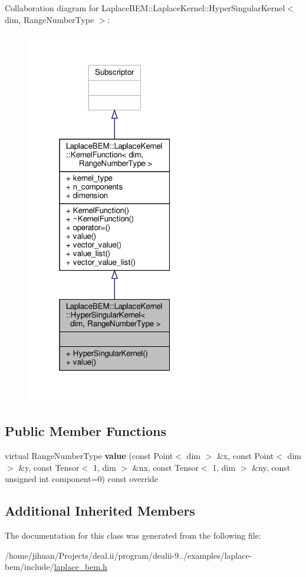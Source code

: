 Collaboration diagram for Laplace\+B\+EM\+:\+:Laplace\+Kernel\+:\+:Hyper\+Singular\+Kernel$<$ dim, Range\+Number\+Type $>$\+:\nopagebreak
\begin{figure}[H]
\begin{center}
\leavevmode
\includegraphics[width=220pt]{classLaplaceBEM_1_1LaplaceKernel_1_1HyperSingularKernel__coll__graph}
\end{center}
\end{figure}
\subsection*{Public Member Functions}
\begin{DoxyCompactItemize}
\item 
\mbox{\label{classLaplaceBEM_1_1LaplaceKernel_1_1HyperSingularKernel_a02811fc623d2bb605c5eeb22712bdfd6}} 
virtual Range\+Number\+Type {\bfseries value} (const Point$<$ dim $>$ \&x, const Point$<$ dim $>$ \&y, const Tensor$<$ 1, dim $>$ \&nx, const Tensor$<$ 1, dim $>$ \&ny, const unsigned int component=0) const override
\end{DoxyCompactItemize}
\subsection*{Additional Inherited Members}


The documentation for this class was generated from the following file\+:\begin{DoxyCompactItemize}
\item 
/home/jihuan/\+Projects/deal.\+ii/program/dealii-\/9../examples/laplace-\/bem/include/\hyperlink{laplace__bem_8h}{laplace\+\_\+bem.\+h}\end{DoxyCompactItemize}
